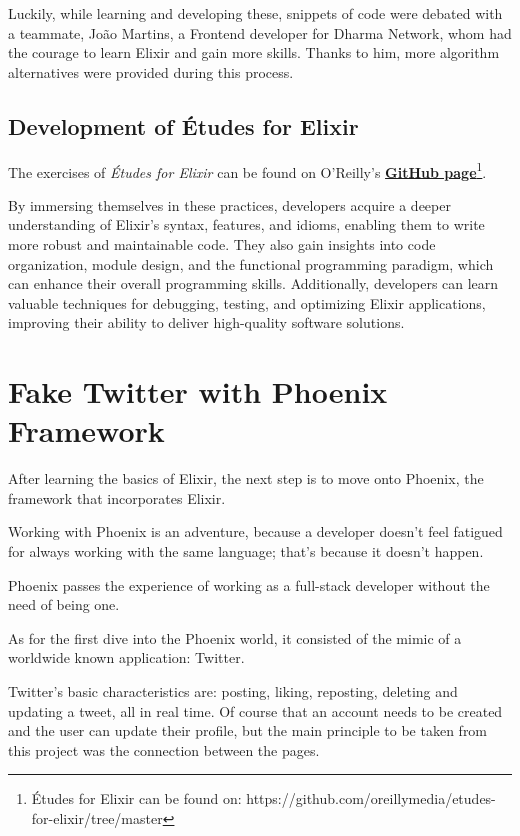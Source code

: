 Luckily, while learning and developing these, snippets of code were debated with a teammate, João Martins, a Frontend developer for Dharma Network, whom had the courage to learn Elixir and gain more skills. Thanks to him, more algorithm alternatives were provided during this process.

\subsection{Development of Études for Elixir}

The exercises of \textit{Études for Elixir} can be found on O'Reilly's \href{https://github.com/oreillymedia/etudes-for-elixir/tree/master}{\textbf{GitHub page}}\footnote{Études for Elixir can be found on: https://github.com/oreillymedia/etudes-for-elixir/tree/master}.\newline


By immersing themselves in these practices, developers acquire a deeper understanding of Elixir's syntax, features, and idioms, enabling them to write more robust and maintainable code. They also gain insights into code organization, module design, and the functional programming paradigm, which can enhance their overall programming skills. Additionally, developers can learn valuable techniques for debugging, testing, and optimizing Elixir applications, improving their ability to deliver high-quality software solutions. 

\section{Fake Twitter with Phoenix Framework}

After learning the basics of Elixir, the next step is to move onto Phoenix, the framework that incorporates Elixir.

Working with Phoenix is an adventure, because a developer doesn't feel fatigued for always working with the same language; that's because it doesn't happen.

Phoenix passes the experience of working as a full-stack developer without the need of being one.

As for the first dive into the Phoenix world, it consisted of the mimic of a worldwide known application: Twitter.

Twitter's basic characteristics are: posting, liking, reposting, deleting and updating a tweet, all in real time. Of course that an account needs to be created and the user can update their profile, but the main principle to be taken from this project was the connection between the pages.

